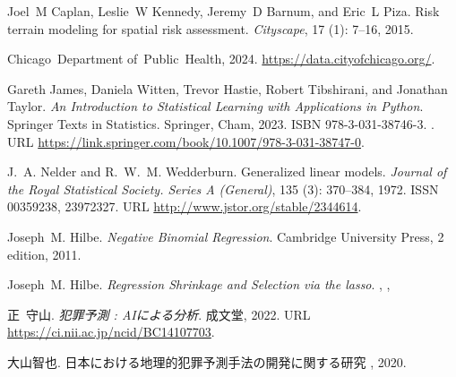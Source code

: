 Joel~M Caplan, Leslie~W Kennedy, Jeremy~D Barnum, and Eric~L Piza.
\newblock Risk terrain modeling for spatial risk assessment.
\newblock \emph{Cityscape}, 17 (1): 7--16, 2015.

Chicago~Department of~Public~Health, 2024.
\newblock \url{https://data.cityofchicago.org/}.

Gareth James, Daniela Witten, Trevor Hastie, Robert Tibshirani, and Jonathan Taylor.
\newblock \emph{An Introduction to Statistical Learning with Applications in Python}.
\newblock Springer Texts in Statistics. Springer, Cham, 2023.
\newblock ISBN 978-3-031-38746-3.
\newblock {}.
\newblock URL \url{https://link.springer.com/book/10.1007/978-3-031-38747-0}.

J.~A. Nelder and R.~W.~M. Wedderburn.
\newblock Generalized linear models.
\newblock \emph{Journal of the Royal Statistical Society. Series A (General)}, 135 (3): 370--384, 1972.
\newblock ISSN 00359238, 23972327.
\newblock URL \url{http://www.jstor.org/stable/2344614}.

Joseph~M. Hilbe.
\newblock \emph{Negative Binomial Regression}.
\newblock Cambridge University Press, 2 edition, 2011.


Joseph~M. Hilbe.
\newblock \emph{Regression Shrinkage and Selection via the lasso}.
, 
, 


正~守山.
\newblock \emph{犯罪予測 : AIによる分析}.
\newblock 成文堂, 2022.
\newblock URL \url{https://ci.nii.ac.jp/ncid/BC14107703}.



大山智也.
\newblock 日本における地理的犯罪予測手法の開発に関する研究
\newblock , 2020.

